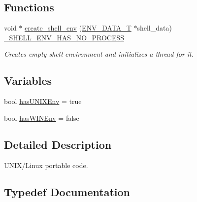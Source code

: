 \subsection*{Functions}
\begin{DoxyCompactItemize}
\item 
void $\ast$ \hyperlink{namespacecrunchy_1_1_u_n_i_x___portable_a783c5685096669bb59980444a7c8b37c}{create\+\_\+shell\+\_\+env} (\hyperlink{namespacecrunchy_1_1_u_n_i_x___portable_a200439e6a525bf357a766278278cda8f}{E\+N\+V\+\_\+\+D\+A\+T\+A\+\_\+\+T} $\ast$shell\+\_\+data) \hyperlink{_c_r_h___signatures_8h_a4cf7ff8aeb847b5144d37bb0f2818387}{\+\_\+\+S\+H\+E\+L\+L\+\_\+\+E\+N\+V\+\_\+\+H\+A\+S\+\_\+\+N\+O\+\_\+\+P\+R\+O\+C\+E\+S\+S}
\begin{DoxyCompactList}\small\item\em Creates empty shell environment and initializes a thread for it. \end{DoxyCompactList}\end{DoxyCompactItemize}
\subsection*{Variables}
\begin{DoxyCompactItemize}
\item 
bool \hyperlink{namespacecrunchy_1_1_u_n_i_x___portable_a84e6dc3bfb38f92ffc2bb374b3819604}{has\+U\+N\+I\+X\+Env} = true
\item 
bool \hyperlink{namespacecrunchy_1_1_u_n_i_x___portable_a1df8cb012e6cbb395a83d8d965e55ae6}{has\+W\+I\+N\+Env} = false
\end{DoxyCompactItemize}


\subsection{Detailed Description}
U\+N\+I\+X/\+Linux portable code. 

\subsection{Typedef Documentation}
\hypertarget{namespacecrunchy_1_1_u_n_i_x___portable_a200439e6a525bf357a766278278cda8f}{}
